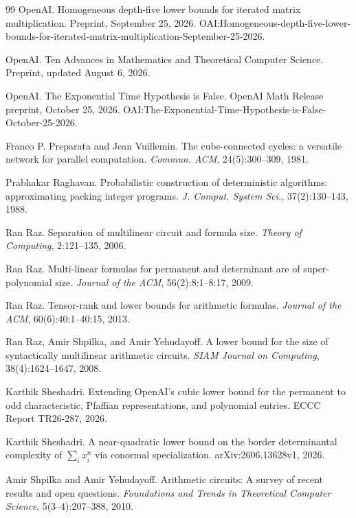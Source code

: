 \begin{thebibliography}{99}
OpenAI. Homogeneous depth-five lower bounds for iterated matrix multiplication.
Preprint, September 25, 2026.
OAI:Homogeneous-depth-five-lower-bounds-for-iterated-matrix-multiplication-September-25-2026.

OpenAI. Ten Advances in Mathematics and Theoretical Computer Science. Preprint, updated
August 6, 2026.

OpenAI. The Exponential Time Hypothesis is False. OpenAI Math Release preprint, October
25, 2026. OAI:The-Exponential-Time-Hypothesis-is-False-October-25-2026.

Franco P. Preparata and Jean Vuillemin. The cube-connected cycles: a versatile network for
parallel computation. \emph{Commun. ACM}, 24(5):300--309, 1981.

Prabhakar Raghavan. Probabilistic construction of deterministic algorithms: approximating
packing integer programs. \emph{J. Comput. System Sci.}, 37(2):130--143, 1988.

Ran Raz. Separation of multilinear circuit and formula size. \emph{Theory of Computing}, 2:121--135,
2006.

Ran Raz. Multi-linear formulas for permanent and determinant are of super-polynomial size.
\emph{Journal of the ACM}, 56(2):8:1--8:17, 2009.

Ran Raz. Tensor-rank and lower bounds for arithmetic formulas. \emph{Journal of the ACM}, 60(6):40:1--40:15, 2013.

Ran Raz, Amir Shpilka, and Amir Yehudayoff. A lower bound for the size of syntactically
multilinear arithmetic circuits. \emph{SIAM Journal on Computing}, 38(4):1624--1647, 2008.

Karthik Sheshadri. Extending OpenAI's cubic lower bound for the permanent to odd characteristic,
Pfaffian representations, and polynomial entries. ECCC Report TR26-287, 2026.

Karthik Sheshadri. A near-quadratic lower bound on the border determinantal complexity of
$\sum_i x_i^n$ via conormal specialization. arXiv:2606.13628v1, 2026.

Amir Shpilka and Amir Yehudayoff. Arithmetic circuits: A survey of recent results and open
questions. \emph{Foundations and Trends in Theoretical Computer Science}, 5(3--4):207--388, 2010.


\end{thebibliography}
